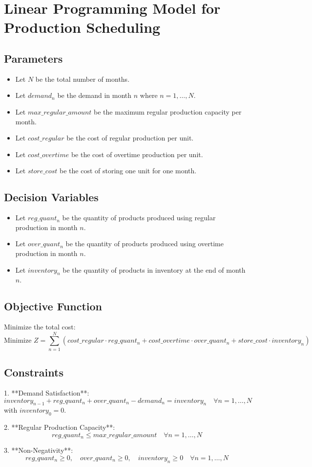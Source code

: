 \documentclass{article}
\begin{document}
\section*{Linear Programming Model for Production Scheduling}

\subsection*{Parameters}
\begin{itemize}
    \item Let \( N \) be the total number of months.
    \item Let \( demand_{n} \) be the demand in month \( n \) where \( n = 1, \ldots, N \).
    \item Let \( max\_regular\_amount \) be the maximum regular production capacity per month.
    \item Let \( cost\_regular \) be the cost of regular production per unit.
    \item Let \( cost\_overtime \) be the cost of overtime production per unit.
    \item Let \( store\_cost \) be the cost of storing one unit for one month.
\end{itemize}

\subsection*{Decision Variables}
\begin{itemize}
    \item Let \( reg\_quant_{n} \) be the quantity of products produced using regular production in month \( n \).
    \item Let \( over\_quant_{n} \) be the quantity of products produced using overtime production in month \( n \).
    \item Let \( inventory_{n} \) be the quantity of products in inventory at the end of month \( n \).
\end{itemize}

\subsection*{Objective Function}
Minimize the total cost:
\[
\text{Minimize } Z = \sum_{n=1}^{N} \left( cost\_regular \cdot reg\_quant_{n} + cost\_overtime \cdot over\_quant_{n} + store\_cost \cdot inventory_{n} \right)
\]

\subsection*{Constraints}
1. **Demand Satisfaction**:
   \[
   inventory_{n-1} + reg\_quant_{n} + over\_quant_{n} - demand_{n} = inventory_{n} \quad \forall n = 1, \ldots, N
   \]
   with \( inventory_{0} = 0 \).

2. **Regular Production Capacity**:
   \[
   reg\_quant_{n} \leq max\_regular\_amount \quad \forall n = 1, \ldots, N
   \]

3. **Non-Negativity**:
   \[
   reg\_quant_{n} \geq 0, \quad over\_quant_{n} \geq 0, \quad inventory_{n} \geq 0 \quad \forall n = 1, \ldots, N
   \]
\end{document}
